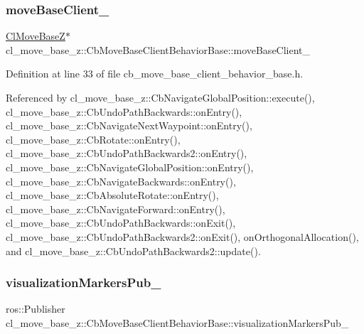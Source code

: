 \subsubsection{\texorpdfstring{move\+Base\+Client\+\_\+}{moveBaseClient\_}}
{\footnotesize\ttfamily \hyperlink{classcl__move__base__z_1_1ClMoveBaseZ}{Cl\+Move\+BaseZ}$\ast$ cl\+\_\+move\+\_\+base\+\_\+z\+::\+Cb\+Move\+Base\+Client\+Behavior\+Base\+::move\+Base\+Client\+\_\+\hspace{0.3cm}{\ttfamily [protected]}}



Definition at line 33 of file cb\+\_\+move\+\_\+base\+\_\+client\+\_\+behavior\+\_\+base.\+h.



Referenced by cl\+\_\+move\+\_\+base\+\_\+z\+::\+Cb\+Navigate\+Global\+Position\+::execute(), cl\+\_\+move\+\_\+base\+\_\+z\+::\+Cb\+Undo\+Path\+Backwards\+::on\+Entry(), cl\+\_\+move\+\_\+base\+\_\+z\+::\+Cb\+Navigate\+Next\+Waypoint\+::on\+Entry(), cl\+\_\+move\+\_\+base\+\_\+z\+::\+Cb\+Rotate\+::on\+Entry(), cl\+\_\+move\+\_\+base\+\_\+z\+::\+Cb\+Undo\+Path\+Backwards2\+::on\+Entry(), cl\+\_\+move\+\_\+base\+\_\+z\+::\+Cb\+Navigate\+Global\+Position\+::on\+Entry(), cl\+\_\+move\+\_\+base\+\_\+z\+::\+Cb\+Navigate\+Backwards\+::on\+Entry(), cl\+\_\+move\+\_\+base\+\_\+z\+::\+Cb\+Absolute\+Rotate\+::on\+Entry(), cl\+\_\+move\+\_\+base\+\_\+z\+::\+Cb\+Navigate\+Forward\+::on\+Entry(), cl\+\_\+move\+\_\+base\+\_\+z\+::\+Cb\+Undo\+Path\+Backwards\+::on\+Exit(), cl\+\_\+move\+\_\+base\+\_\+z\+::\+Cb\+Undo\+Path\+Backwards2\+::on\+Exit(), on\+Orthogonal\+Allocation(), and cl\+\_\+move\+\_\+base\+\_\+z\+::\+Cb\+Undo\+Path\+Backwards2\+::update().

\mbox{\label{classcl__move__base__z_1_1CbMoveBaseClientBehaviorBase_aff48fc567ae025b196efd8895b7fb35d}} 
\subsubsection{\texorpdfstring{visualization\+Markers\+Pub\+\_\+}{visualizationMarkersPub\_}}
{\footnotesize\ttfamily ros\+::\+Publisher cl\+\_\+move\+\_\+base\+\_\+z\+::\+Cb\+Move\+Base\+Client\+Behavior\+Base\+::visualization\+Markers\+Pub\+\_\+\hspace{0.3cm}{\ttfamily [protected]}}



